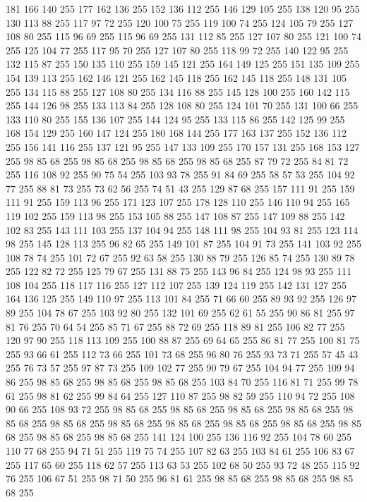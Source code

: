 181 166 140 255 177 162 136 255 152 136 112 255 146 129 105 255 138 120 95 255 130 113 88 255 117 97 72 255 120 100 75 255 119 100 74 255 124 105 79 255 127 108 80 255 115 96 69 255 115 96 69 255 131 112 85 255 127 107 80 255 121 100 74 255 125 104 77 255 117 95 70 255 127 107 80 255 118 99 72 255 140 122 95 255 132 115 87 255 150 135 110 255 159 145 121 255 164 149 125 255 151 135 109 255 154 139 113 255 162 146 121 255 162 145 118 255 162 145 118 255 148 131 105 255 134 115 88 255 127 108 80 255 134 116 88 255 145 128 100 255 160 142 115 255 144 126 98 255 133 113 84 255 128 108 80 255 124 101 70 255 131 100 66 255 133 110 80 255 155 136 107 255 144 124 95 255 133 115 86 255 142 125 99 255 168 154 129 255 160 147 124 255 180 168 144 255 177 163 137 255 152 136 112 255 156 141 116 255 137 121 95 255 147 133 109 255 170 157 131 255 168 153 127 255 98 85 68 255 98 85 68 255 98 85 68 255 98 85 68 255 87 79 72 255 84 81 72 255 116 108 92 255 90 75 54 255
103 93 78 255 91 84 69 255 58 57 53 255 104 92 77 255 88 81 73 255 73 62 56 255 74 51 43 255 129 87 68 255 157 111 91 255 159 111 91 255 159 113 96 255 171 123 107 255 178 128 110 255 146 110 94 255 165 119 102 255 159 113 98 255 153 105 88 255 147 108 87 255 147 109 88 255 142 102 83 255 143 111 103 255 137 104 94 255 148 111 98 255 104 93 81 255 123 114 98 255 145 128 113 255 96 82 65 255 149 101 87 255 104 91 73 255 141 103 92 255 108 78 74 255 101 72 67 255 92 63 58 255 130 88 79 255 126 85 74 255 130 89 78 255 122 82 72 255 125 79 67 255 131 88 75 255 143 96 84 255 124 98 93 255 111 108 104 255 118 117 116 255 127 112 107 255 139 124 119 255 142 131 127 255 164 136 125 255 149 110 97 255 113 101 84 255 71 66 60 255 89 93 92 255 126 97 89 255 104 78 67 255 103 92 80 255 132 101 69 255 62 61 55 255 90 86 81 255 97 81 76 255 70 64 54 255 85 71 67 255 88 72 69 255 118 89 81 255 106 82 77 255 120 97 90 255
118 113 109 255 100 88 87 255 69 64 65 255 86 81 77 255 100 81 75 255 93 66 61 255 112 73 66 255 101 73 68 255 96 80 76 255 93 73 71 255 57 45 43 255 76 73 57 255 97 87 73 255 109 102 77 255 90 79 67 255 104 94 77 255 109 94 86 255 98 85 68 255 98 85 68 255 98 85 68 255 103 84 70 255 116 81 71 255 99 78 61 255 98 81 62 255 99 84 64 255 127 110 87 255 98 82 59 255 110 94 72 255 108 90 66 255 108 93 72 255 98 85 68 255 98 85 68 255 98 85 68 255 98 85 68 255 98 85 68 255 98 85 68 255 98 85 68 255 98 85 68 255 98 85 68 255 98 85 68 255 98 85 68 255 98 85 68 255 98 85 68 255 141 124 100 255 136 116 92 255 104 78 60 255 110 77 68 255 94 71 51 255 119 75 74 255 107 82 63 255 103 84 61 255 106 83 67 255 117 65 60 255 118 62 57 255 113 63 53 255 102 68 50 255 93 72 48 255 115 92 76 255 106 67 51 255 98 71 50 255 96 81 61 255 98 85 68 255 98 85 68 255 98 85 68 255
